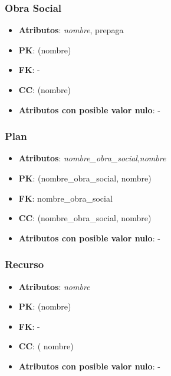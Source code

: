 \documentclass[a4paper,11pt]{article}
\begin{document}
\subsubsection{\textbf{Obra Social}}

\begin{itemize}

\item 
\textbf{Atributos}: \emph{nombre}, prepaga

\item 
\textbf{PK}: (nombre)

\item
\textbf{FK}: -

\item 
\textbf{CC}: (nombre)

\item 
\textbf{Atributos con posible valor nulo}: -

\end{itemize}

\subsubsection{\textbf{Plan}}

\begin{itemize}

\item 
\textbf{Atributos}: \emph{nombre\_obra\_social},\emph{nombre}

\item 
\textbf{PK}: (nombre\_obra\_social, nombre)

\item
\textbf{FK}: nombre\_obra\_social

\item 
\textbf{CC}: (nombre\_obra\_social, nombre)

\item 
\textbf{Atributos con posible valor nulo}: -

\end{itemize}
\subsubsection{\textbf{Recurso}}

\begin{itemize}

\item 
\textbf{Atributos}: \emph{nombre}

\item 
\textbf{PK}: (nombre)

\item
\textbf{FK}: -

\item 
\textbf{CC}: ( nombre)

\item 
\textbf{Atributos con posible valor nulo}: -

\end{itemize}
\end{document}

